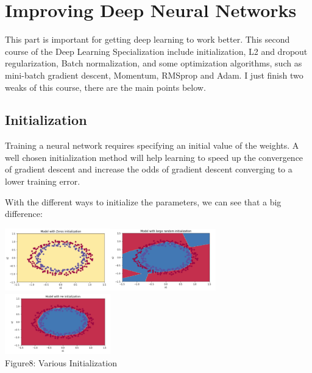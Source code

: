 \documentclass[a4paper]{article}
\begin{document}
\newpage

\section{Improving Deep Neural Networks}

This part is important for getting deep learning to work better. This second course of the Deep Learning Specialization include initialization, L2 and dropout regularization, Batch normalization, and some optimization algorithms, such as mini-batch gradient descent, Momentum, RMSprop and Adam. I just finish two weaks of this course, there are the main points below.

\subsection{Initialization}

Training a neural network requires specifying an initial value of the weights. A well chosen initialization method will help learning to speed up the convergence of gradient descent and increase the odds of gradient descent converging to a lower training  error.

With the different ways to initialize the parameters, we can see that a big difference:

\begin{center}
\includegraphics[width=1.8in]{zero.png}\includegraphics[width=1.8in]{rand.png}\includegraphics[width=1.8in]{he.png}\\
Figure8: Various Initialization
\end{center}
\end{document}
